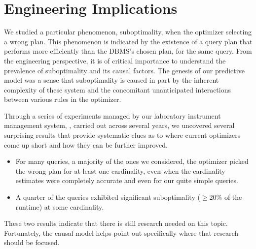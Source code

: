 \documentclass[prodmode,acmtods]{acmsmall}
\def\azdb{\doubleblind{\hbox{\sc AZDBLab}}{\hbox{\sc DBLab}}}
\begin{document}
\section{Engineering Implications}\label{sec:engineering}
We studied a particular
phenomenon, suboptimality, when the \hbox{optimizer} selecting a wrong
plan. This phenomenon is indicated by the existence of a query plan that performs more efficiently
than the DBMS's chosen plan, for the same query. From the engineering
\hbox{perspective}, it is of critical importance to understand the prevalence
of suboptimality and its causal factors. The genesis of our predictive model was a sense that suboptimality
is caused in part by the inherent complexity of these system and the
concomitant unanticipated interactions between various rules in the
optimizer.

Through a series of experiments managed by our laboratory instrument
management system, \azdb, carried out across several years, we uncovered
several surprising results that provide systematic clues as to where current optimizers come up
short and how they can be further improved.

\begin{itemize}
\item For many queries, a majority of the ones we
considered, the optimizer picked the wrong plan for at least one
cardinality, even when the cardinality estimates were completely accurate
and even for our quite simple queries.

\item A quarter of the queries exhibited significant suboptimality ($\geq 20\%$ of
        the runtime) at some cardinality.
\end{itemize}
\noindent
These two results indicate that there is still research needed on
this topic. Fortunately, the causal model helps point out
specifically where that research should be focused.
\end{document}
